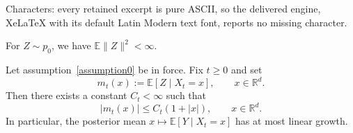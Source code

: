 \documentclass[10pt,a4paper]{amsart}
\newcommand{\E}{\mathbb{E}}
\begin{document}
Characters: every retained excerpt is pure ASCII, so the delivered engine, XeLaTeX with its default Latin Modern text font, reports no missing character.
\begin{assumption}\label{assumption0}
For $Z\sim p_0$, we have $\E\|Z\|^2<\infty$.
\end{assumption}

\begin{lemma}\label{lem:posterior-mean-linear-growth}
Let assumption~\ref{assumption0} be in force. Fix $t\ge 0$ and set
\[
m_t(x):=\mathbb E[Z\mid X_t=x],\qquad x\in\mathbb R^d.
\]
Then there exists a constant $C_t<\infty$ such that
\[
|m_t(x)|\le C_t(1+|x|),\qquad x\in\mathbb R^d.
\]
In particular, the posterior mean $x\mapsto \mathbb E[Y\mid X_t=x]$ has at most linear growth.
\end{lemma}
\end{document}
